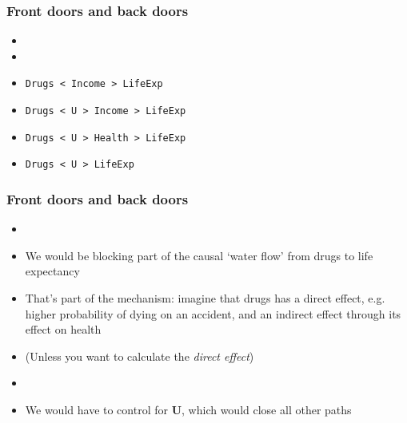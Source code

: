 \begin{frame}
\frametitle{Front doors and back doors}
\centering

\begin{itemize}
  \item {}
  \item {}
  \item \texttt{Drugs < Income > LifeExp}
  \item \texttt{Drugs < U > Income > LifeExp}
  \item \texttt{Drugs < U > Health > LifeExp}
  \item \texttt{Drugs < U > LifeExp}
\end{itemize}

\end{frame}
\note{}

\begin{frame}
\frametitle{Front doors and back doors}
\centering

\begin{itemize}
  \item {}
  \item We would be blocking part of the causal `water flow' from drugs to life expectancy
  \item That's part of the mechanism: imagine that drugs has a direct effect, e.g. higher probability of dying on an accident, and an indirect effect through its effect on health
  \item (Unless you want to calculate the \textit{direct effect})
  \item[]
  \item<2-> We would have to control for \textbf{U}, which would close all other paths
\end{itemize}

\end{frame}
\note{}

